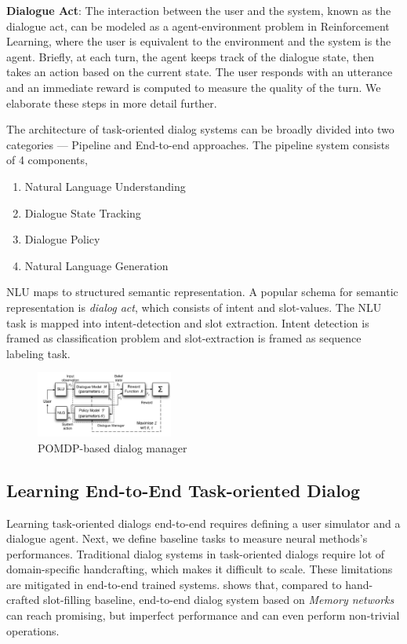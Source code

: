 \documentclass[11pt,a4paper]{article}
\begin{document}
\medskip \noindent \textbf{Dialogue Act}: The interaction between the user and the system, known as the dialogue act, can be modeled as a agent-environment problem in Reinforcement Learning, where the user is equivalent to the environment and the system is the agent. Briefly, at each turn, the agent keeps track of the dialogue state, then takes an action based on the current state. The user responds with an utterance and an immediate reward is computed to measure the quality of the turn. We elaborate these steps in more detail further.

The architecture of task-oriented dialog systems can be broadly divided into two categories --- Pipeline and End-to-end approaches. The pipeline system consists of 4 components,

\begin{enumerate}
  \setlength\itemsep{0em}
  \item Natural Language Understanding
  \item Dialogue State Tracking
  \item Dialogue Policy
  \item Natural Language Generation
\end{enumerate}

NLU maps to structured semantic representation. A popular schema for semantic representation is \textit{dialog act}, which consists of intent and slot-values.
The NLU task is mapped into intent-detection and slot extraction. Intent detection is framed as classification problem and slot-extraction is framed as sequence labeling task.

\begin{figure}[h]
  \centering
  \includegraphics[width=0.4\textwidth]{./images/pomdb_dialog_manager.png}
  \caption{POMDP-based dialog manager}
\end{figure}

\subsection{Learning End-to-End Task-oriented Dialog}

Learning task-oriented dialogs end-to-end requires defining a user simulator and a dialogue agent. Next, we define baseline tasks to measure neural methods's performances. Traditional dialog systems in task-oriented dialogs require lot of domain-specific handcrafting, which makes it difficult to scale. These limitations are mitigated in end-to-end trained systems. \cite{Bordes2016LearningEG} shows that, compared to hand-crafted slot-filling baseline, end-to-end dialog system based on \textit{Memory networks} \cite{Sukhbaatar2015EndToEndMN} can reach promising, but imperfect performance and can even perform non-trivial operations.
\end{document}
